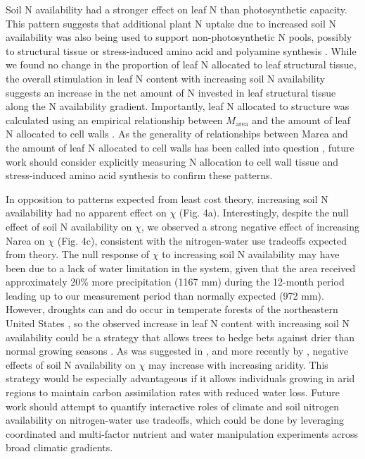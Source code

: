     Soil N availability had a stronger effect on leaf N than photosynthetic capacity. This pattern suggests that additional plant N uptake due to increased soil N availability was also being used to support non-photosynthetic N pools, possibly to structural tissue or stress-induced amino acid and polyamine synthesis . While we found no change in the proportion of leaf N allocated to leaf structural tissue, the overall stimulation in leaf N content with increasing soil N availability suggests an increase in the net amount of N invested in leaf structural tissue along the N availability gradient. Importantly, leaf N allocated to structure was calculated using an empirical relationship between $M_\mathrm{area}$ and the amount of leaf N allocated to cell walls . As the generality of relationships between Marea and the amount of leaf N allocated to cell walls has been called into question , future work should consider explicitly measuring N allocation to cell wall tissue and stress-induced amino acid synthesis to confirm these patterns.
    
    In opposition to patterns expected from least cost theory, increasing soil N availability had no apparent effect on $\chi$ (Fig. 4a). Interestingly, despite the null effect of soil N availability on $\chi$, we observed a strong negative effect of increasing Narea on $\chi$ (Fig. 4c), consistent with the nitrogen-water use tradeoffs expected from theory. The null response of $\chi$ to increasing soil N availability may have been due to a lack of water limitation in the system, given that the area received approximately 20\% more precipitation (1167 mm) during the 12-month period leading up to our measurement period than normally expected (972 mm). However, droughts can and do occur in temperate forests of the northeastern United States , so the observed increase in leaf N content with increasing soil N availability could be a strategy that allows trees to hedge bets against drier than normal growing seasons . As was suggested in , and more recently by , negative effects of soil N availability on $\chi$ may increase with increasing aridity. This strategy would be especially advantageous if it allows individuals growing in arid regions to maintain carbon assimilation rates with reduced water loss. Future work should attempt to quantify interactive roles of climate and soil nitrogen availability on nitrogen-water use tradeoffs, which could be done by leveraging coordinated and multi-factor nutrient  and water  manipulation experiments across broad climatic gradients.
    
